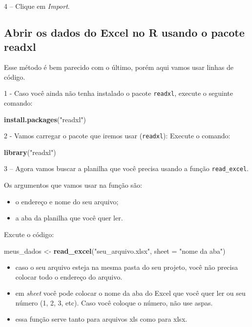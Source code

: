 \documentclass[
]{book}
\newenvironment{Shaded}{\begin{snugshade}}{\end{snugshade}}
\newcommand{\DataTypeTok}[1]{\textcolor[rgb]{0.13,0.29,0.53}{#1}}
\newcommand{\KeywordTok}[1]{\textcolor[rgb]{0.13,0.29,0.53}{\textbf{#1}}}
\newcommand{\NormalTok}[1]{#1}
\newcommand{\StringTok}[1]{\textcolor[rgb]{0.31,0.60,0.02}{#1}}
\providecommand{\tightlist}{%
  \setlength{\itemsep}{0pt}\setlength{\parskip}{0pt}}
\begin{document}
4 -- Clique em \emph{Import}.

\hypertarget{abrir-os-dados-do-excel-no-r-usando-o-pacote-readxl}{%
\subsection{Abrir os dados do Excel no R usando o pacote
readxl}\label{abrir-os-dados-do-excel-no-r-usando-o-pacote-readxl}}

Esse método é bem parecido com o último, porém aqui vamos usar linhas de
código.

1 - Caso você ainda não tenha instalado o pacote \texttt{readxl},
execute o seguinte comando:

\begin{Shaded}
\begin{Highlighting}[]
\KeywordTok{install.packages}\NormalTok{(}\StringTok{"readxl"}\NormalTok{)}
\end{Highlighting}
\end{Shaded}

2 - Vamos carregar o pacote que iremos usar (\texttt{readxl}): Execute o
comando:

\begin{Shaded}
\begin{Highlighting}[]
\KeywordTok{library}\NormalTok{(}\StringTok{"readxl"}\NormalTok{)}
\end{Highlighting}
\end{Shaded}

3 -- Agora vamos buscar a planilha que você precisa usando a função
\texttt{read\_excel}.

Os argumentos que vamos usar na função são:

\begin{itemize}
\tightlist
\item
  o endereço e nome do seu arquivo;
\item
  a aba da planilha que você quer ler.
\end{itemize}

Excute o código:

\begin{Shaded}
\begin{Highlighting}[]
\NormalTok{meus_dados <-}\StringTok{ }\KeywordTok{read_excel}\NormalTok{(}\StringTok{"seu_arquivo.xlsx"}\NormalTok{, }\DataTypeTok{sheet =} \StringTok{"nome da aba"}\NormalTok{)}
\end{Highlighting}
\end{Shaded}

\begin{itemize}
\item
  caso o seu arquivo esteja na mesma pasta do seu projeto, você não
  precisa colocar todo o endereço do arquivo.
\item
  em \emph{sheet} você pode colocar o nome da aba do Excel que você quer
  ler ou seu número (1, 2, 3, etc). Caso você coloque o número, não use
  aspas.
\item
  essa função serve tanto para arquivos xls como para xlsx.
\end{itemize}
\end{document}
